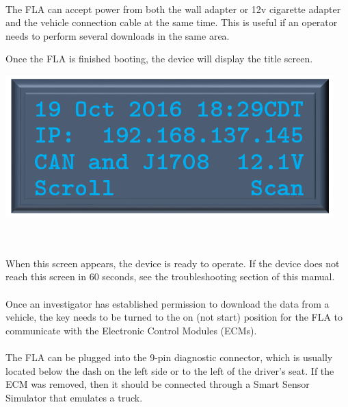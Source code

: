 \documentclass[11pt, oneside]{book}
\begin{document}
\paragraph{  }
The FLA can accept power from both the wall adapter or 12v cigarette adapter and the vehicle connection cable at the same time. This is useful if an operator needs to perform several downloads in the same area.
\\[\baselineskip]
\noindent\begin{minipage}{0.45\textwidth}%
	Once the FLA is finished booting, the device will display the title screen.
\end{minipage}%
\hfill%
\begin{minipage}{0.45\textwidth} 
	\includegraphics[width=\linewidth]{../media/pstricks_files/01_main_screen}
\end{minipage}\\[\baselineskip]
\paragraph{  }
When this screen appears, the device is ready to operate. If the device does not reach this screen in 60 seconds, see the troubleshooting section of this manual.
\paragraph{  }
Once an investigator has established permission to download the data from a vehicle, the key needs to be turned to the on (not start) position for the FLA to communicate with the Electronic Control Modules (ECMs).
\paragraph{  }
The FLA can be plugged into the 9-pin diagnostic connector, which is usually located below the dash on the left side or to the left of the driver's seat. If the ECM was removed, then it should be connected through a Smart Sensor Simulator that emulates a truck. 
\end{document}

